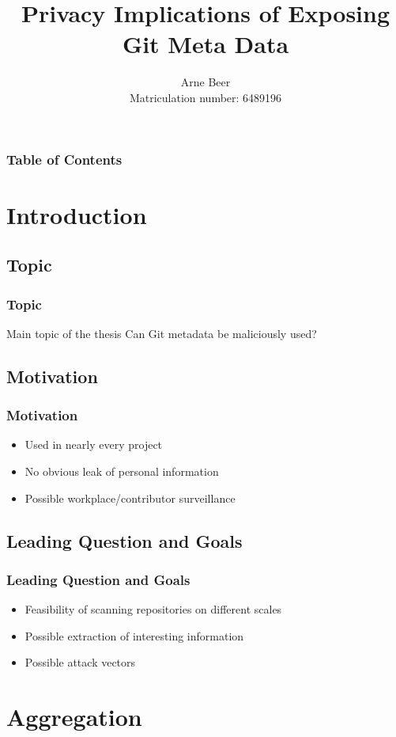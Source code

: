\documentclass{beamer}
\title[Privacy Implications of Exposing Git Metadata]
{Privacy Implications of Exposing Git Meta Data}
\author[Beer]{Arne Beer \\ \footnotesize Matriculation number: 6489196}
\institute[University of Hamburg]{
    Department of Computer Science\\
    University of Hamburg
}
\begin{document}
\frame{\titlepage}
\begin{frame}
    \frametitle{Table of Contents}
    \footnotesize
    \tableofcontents
\end{frame}

\section{Introduction}

\subsection{Topic}
\begin{frame}
    \frametitle{Topic}
    \begin{block}{Main topic of the thesis}
        Can Git metadata be maliciously used?
    \end{block}
\end{frame}

\subsection{Motivation}
\begin{frame}
    \frametitle{Motivation}
    \begin{itemize}
        \item Used in nearly every project
        \pause{}
        \item No obvious leak of personal information
        \pause{}
        \item Possible workplace/contributor surveillance
    \end{itemize}
\end{frame}

\subsection{Leading Question and Goals}
\begin{frame}
    \frametitle{Leading Question and Goals}
    \begin{itemize}
        \item Feasibility of scanning repositories on different scales
        \item Possible extraction of interesting information
        \item Possible attack vectors
    \end{itemize}
\end{frame}

\section{Aggregation}
\end{document}
